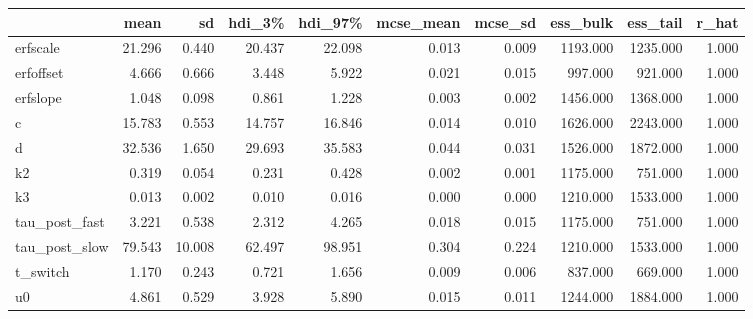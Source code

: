 \begin{tabular}{lrrrrrrrrr}
\toprule
 & mean & sd & hdi\_3\% & hdi\_97\% & mcse\_mean & mcse\_sd & ess\_bulk & ess\_tail & r\_hat \\
\midrule
erfscale & 21.296 & 0.440 & 20.437 & 22.098 & 0.013 & 0.009 & 1193.000 & 1235.000 & 1.000 \\
erfoffset & 4.666 & 0.666 & 3.448 & 5.922 & 0.021 & 0.015 & 997.000 & 921.000 & 1.000 \\
erfslope & 1.048 & 0.098 & 0.861 & 1.228 & 0.003 & 0.002 & 1456.000 & 1368.000 & 1.000 \\
c & 15.783 & 0.553 & 14.757 & 16.846 & 0.014 & 0.010 & 1626.000 & 2243.000 & 1.000 \\
d & 32.536 & 1.650 & 29.693 & 35.583 & 0.044 & 0.031 & 1526.000 & 1872.000 & 1.000 \\
k2 & 0.319 & 0.054 & 0.231 & 0.428 & 0.002 & 0.001 & 1175.000 & 751.000 & 1.000 \\
k3 & 0.013 & 0.002 & 0.010 & 0.016 & 0.000 & 0.000 & 1210.000 & 1533.000 & 1.000 \\
tau\_post\_fast & 3.221 & 0.538 & 2.312 & 4.265 & 0.018 & 0.015 & 1175.000 & 751.000 & 1.000 \\
tau\_post\_slow & 79.543 & 10.008 & 62.497 & 98.951 & 0.304 & 0.224 & 1210.000 & 1533.000 & 1.000 \\
t\_switch & 1.170 & 0.243 & 0.721 & 1.656 & 0.009 & 0.006 & 837.000 & 669.000 & 1.000 \\
u0 & 4.861 & 0.529 & 3.928 & 5.890 & 0.015 & 0.011 & 1244.000 & 1884.000 & 1.000 \\
\bottomrule
\end{tabular}
